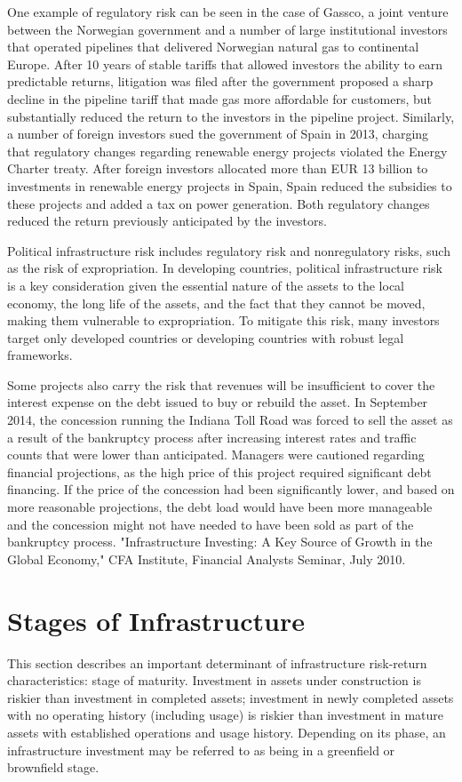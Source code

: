 \documentclass[11pt]{article}
\begin{document}
One example of regulatory risk can be seen in the case of Gassco, a joint venture between the Norwegian government and a number of large institutional investors that operated pipelines that delivered Norwegian natural gas to continental Europe. After 10 years of stable tariffs that allowed investors the ability to earn predictable returns, litigation was filed after the government proposed a sharp decline in the pipeline tariff that made gas more affordable for customers, but substantially reduced the return to the investors in the pipeline project. Similarly, a number of foreign investors sued the government of Spain in 2013, charging that regulatory changes regarding renewable energy projects violated the Energy Charter treaty. After foreign investors allocated more than EUR 13 billion to investments in renewable energy projects in Spain, Spain reduced the subsidies to these projects and added a tax on power generation. Both regulatory changes reduced the return previously anticipated by the investors.

Political infrastructure risk includes regulatory risk and nonregulatory risks, such as the risk of expropriation. In developing countries, political infrastructure risk is a key consideration given the essential nature of the assets to the local economy, the long life of the assets, and the fact that they cannot be moved, making them vulnerable to expropriation. To mitigate this risk, many investors target only developed countries or developing countries with robust legal frameworks.

Some projects also carry the risk that revenues will be insufficient to cover the interest expense on the debt issued to buy or rebuild the asset. In September 2014, the concession running the Indiana Toll Road was forced to sell the asset as a result of the bankruptcy process after increasing interest rates and traffic counts that were lower than anticipated. Managers were cautioned regarding financial projections, as the high price of this project required significant debt financing. If the price of the concession had been significantly lower, and based on more reasonable projections, the debt load would have been more manageable and the concession might not have needed to have been sold as part of the bankruptcy process. "Infrastructure Investing: A Key Source of Growth in the Global Economy," CFA Institute, Financial Analysts Seminar, July 2010.

\section*{Stages of Infrastructure}
This section describes an important determinant of infrastructure risk-return characteristics: stage of maturity. Investment in assets under construction is riskier than investment in completed assets; investment in newly completed assets with no operating history (including usage) is riskier than investment in mature assets with established operations and usage history. Depending on its phase, an infrastructure investment may be referred to as being in a greenfield or brownfield stage.
\end{document}

